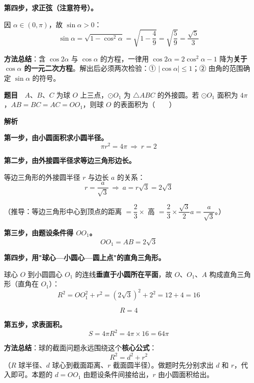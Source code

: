 \textbf{第四步，求正弦（注意符号）。}

因 $\alpha\in(0,\pi)$，故 $\sin\alpha>0$：
\[\sin\alpha=\sqrt{1-\cos^{2}\alpha}=\sqrt{1-\frac49}=\sqrt{\frac59}=\frac{\sqrt5}3\]


\begin{gktip}
\textbf{方法总结}：含 $\cos2\alpha$ 与 $\cos\alpha$ 的方程，一律用 $\cos2\alpha=2\cos^{2}\alpha-1$ 降为\textbf{关于 $\cos\alpha$ 的一元二次方程}。解出后必须两次检验：① $|\cos\alpha|\le1$；② 由角的范围确定 $\sin\alpha$ 的符号。
\end{gktip}

\par\medskip


\textbf{题目}　$A$、$B$、$C$ 为球 $O$ 上三点，$\odot O_1$ 为 $\triangle ABC$ 的外接圆。若 $\odot O_1$ 面积为 $4\pi$，$AB=BC=AC=OO_1$，则球 $O$ 的表面积为（　　）

\textbf{解析}

\textbf{第一步，由小圆面积求小圆半径。}
\[\pi r^{2}=4\pi\ \Longrightarrow\ r=2\]

\textbf{第二步，由外接圆半径求等边三角形边长。}

等边三角形的外接圆半径 $r$ 与边长 $a$ 的关系：
\[r=\frac a{\sqrt3}\ \Longrightarrow\ a=r\sqrt3=2\sqrt3\]

（推导：等边三角形中心到顶点的距离 $=\dfrac23\times$ 高 $=\dfrac23\times\dfrac{\sqrt3}2a=\dfrac a{\sqrt3}$。）

\textbf{第三步，由题设条件得 $OO_1$。}
\[OO_1=AB=2\sqrt3\]

\textbf{第四步，用"球心—小圆心—圆上点"的直角三角形。}

球心 $O$ 到小圆圆心 $O_1$ 的连线\textbf{垂直于小圆所在平面}，故 $O$、$O_1$、$A$ 构成直角三角形（直角在 $O_1$）：
\[R^{2}=OO_1^{2}+r^{2}=\left(2\sqrt3\right)^{2}+2^{2}=12+4=16\]

\[R=4\]

\textbf{第五步，求表面积。}
\[S=4\pi R^{2}=4\pi\times16=64\pi\]


\begin{gktip}
\textbf{方法总结}：球的截面问题永远围绕这个\textbf{核心公式}：
\[R^{2}=d^{2}+r^{2}\]
（$R$ 球半径、$d$ 球心到截面距离、$r$ 截面圆半径）。做题时先分别求出 $d$ 和 $r$，代入即可。本题的 $d=OO_1$ 由题设条件间接给出，$r$ 由小圆面积给出。
\end{gktip}

